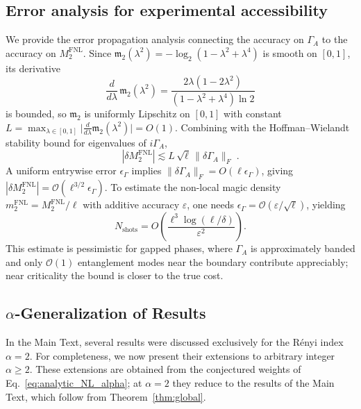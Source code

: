 \documentclass[prx,twocolumn,superscriptaddress,aps,10pt, frontmatterverbose, reprint,footinbib,longbibliography=true]{revtex4-2}
\begin{document}
\subsection{Error analysis for experimental accessibility}
\label{app:experimental}
We provide the error propagation analysis connecting the accuracy on $\Gamma_A$ to the accuracy on $M_2^{\mathrm{FNL}}$.
Since $\mathfrak{m}_2(\lambda^2) = -\log_2(1-\lambda^2+\lambda^4)$ is smooth on $[0,1]$, its derivative
\begin{equation}
    \frac{d}{d\lambda}\,\mathfrak{m}_2(\lambda^2) = \frac{2\lambda(1-2\lambda^2)}{(1-\lambda^2+\lambda^4)\ln 2}
\end{equation}
is bounded, so $\mathfrak{m}_2$ is uniformly Lipschitz on $[0,1]$ with constant $L = \max_{\lambda \in [0,1]} \bigl|\frac{d}{d\lambda}\mathfrak{m}_2(\lambda^2)\bigr| = O(1)$.
Combining with the Hoffman--Wielandt stability bound for eigenvalues of $i\Gamma_A$,
\begin{equation}
    |\delta M_2^{\mathrm{FNL}}| \lesssim L\,\sqrt{\ell}\,\|\delta\Gamma_A\|_F\;.
\end{equation}
A uniform entrywise error $\epsilon_\Gamma$ implies $\|\delta\Gamma_A\|_F = O(\ell \epsilon_\Gamma)$, giving $|\delta M_2^{\mathrm{FNL}}| = \mathcal{O}(\ell^{3/2}\epsilon_\Gamma)$.
To estimate the non-local magic density $m_2^{\mathrm{FNL}} = M_2^{\mathrm{FNL}}/\ell$ with additive accuracy $\varepsilon$, one needs $\epsilon_\Gamma = \mathcal{O}(\varepsilon/\sqrt{\ell})$, yielding
\begin{equation}
    N_{\mathrm{shots}} = O\!\left(\frac{\ell^3\log(\ell/\delta)}{\varepsilon^2}\right).
\end{equation}
This estimate is pessimistic for gapped phases, where $\Gamma_A$ is approximately banded and only $\mathcal{O}(1)$ entanglement modes near the boundary contribute appreciably; near criticality the bound is closer to the true cost.

\subsection{$\alpha$-Generalization of Results}
\label{Sec:generaliz}

In the Main Text, several results were discussed exclusively for the Rényi index $\alpha = 2$. For completeness, we now present their extensions to arbitrary integer $\alpha \ge 2$. These extensions are obtained from the conjectured weights of Eq.~\eqref{eq:analytic_NL_alpha}; at $\alpha=2$ they reduce to the results of the Main Text, which follow from Theorem~\ref{thm:global}.
\end{document}
